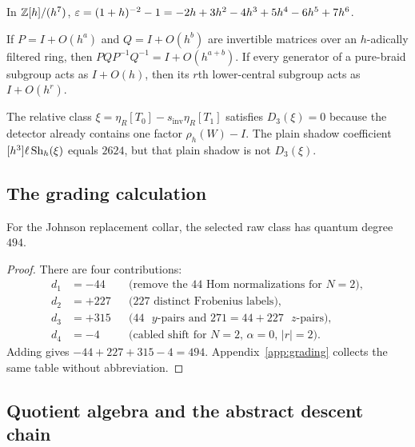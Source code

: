 \begin{lemma}\label{lem:eps-of-h}
In $\mathbb{Z}[h]/(h^7)$,
$\varepsilon=(1+h)^{-2}-1=-2h+3h^2-4h^3+5h^4-6h^5+7h^6$.
\end{lemma}

\begin{lemma}\label{lem:commutator-order}
If $P=I+O(h^a)$ and $Q=I+O(h^b)$ are invertible matrices over an
$h$-adically filtered ring, then $PQP^{-1}Q^{-1}=I+O(h^{a+b})$.  If every
generator of a pure-braid subgroup acts as $I+O(h)$, then its $r$th
lower-central subgroup acts as $I+O(h^r)$.
\end{lemma}

\begin{remark}\label{rem:vT-xi}
The relative class $\xi=\eta_R[T_0]-s_{\mathrm{inv}}\eta_R[T_1]$ satisfies
$D_3(\xi)=0$ because the detector already contains one factor
$\rho_h(W)-I$.  The plain shadow coefficient $[h^3]\ell\operatorname{Sh}_h(\xi)$ equals
$2624$, but that plain shadow is not $D_3(\xi)$.
\end{remark}

\subsection{The grading calculation}

\begin{proposition}\label{prop:degree-494}
For the Johnson replacement collar, the selected raw class has quantum
degree $494$.
\end{proposition}

\begin{proof}
There are four contributions:
\begin{align}
d_1&=-44 &&\text{(remove the $44$ Hom normalizations for $N=2$)},\\
d_2&=+227 &&\text{($227$ distinct Frobenius labels)},\\
d_3&=+315 &&\text{($44$ $y$-pairs and $271=44+227$ $z$-pairs)},\\
d_4&=-4 &&\text{(cabled shift for $N=2$, $\alpha=0$, $|r|=2$)}.
\end{align}
Adding gives $-44+227+315-4=494$.  Appendix~\ref{app:grading} collects the
same table without abbreviation.
\end{proof}

\subsection{Quotient algebra and the abstract descent chain}

